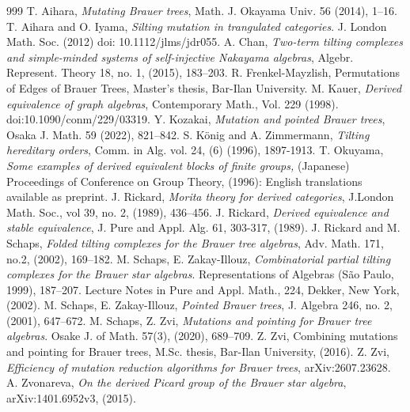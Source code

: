 \documentclass[11pt,english]{article}
\numberwithin{figure}{section}
\numberwithin{equation}{section}
\numberwithin{table}{section}
\theoremstyle{definition}
\theoremstyle{remark}
\begin{document}
\begin{thebibliography}{999}
	T. Aihara, \textit{ Mutating Brauer trees}, {Math. J. Okayama Univ}. 56 (2014), 1--16.
	T. Aihara and O. Iyama, \textit{ Silting mutation in trangulated categories}. J. London Math. Soc. (2012) doi: 10.1112/jlms/jdr055.
	A. Chan, \textit{Two-term tilting complexes and simple-minded systems of self-injective Nakayama algebras}, {Algebr. Represent. Theory 18}, no. 1, (2015), 183--203.
	 R. Frenkel-Mayzlish, Permutations of Edges of Brauer Trees, Master's thesis, Bar-Ilan University. 
	M. Kauer, \textit{Derived equivalence of graph algebras}, Contemporary Math., Vol. 229 (1998). doi:10.1090/conm/229/03319.
	 Y. Kozakai, \textit{Mutation and pointed Brauer trees},  Osaka J. Math. 59 (2022), 821–842. 
	S.  König and A. Zimmermann, \textit{Tilting hereditary orders},{ Comm. in Alg.} vol. 24, (6) (1996), 1897-1913.
	 T. Okuyama, \textit{Some examples of derived equivalent blocks of finite groups,} (Japanese)  Proceedings of Conference on Group Theory, (1996):  English translations available as preprint.
	J. Rickard, \textit{Morita theory for derived categories}, {J.London Math. Soc.}, vol 39, no. 2, (1989), 436--456.
	J. Rickard, \textit{Derived equivalence and stable equivalence},  {J. Pure and Appl. Alg.} 61, 303-317, (1989).
	J. Rickard and  M. Schaps, \textit{Folded tilting complexes for the Brauer tree algebras}, {Adv. Math.} 171, no.2, (2002), 169--182.
	M. Schaps, E. Zakay-Illouz, \textit{Combinatorial partial tilting complexes for the Brauer star algebras}. Representations of Algebras (São Paulo, 1999), 187--207. Lecture Notes in Pure and Appl. Math., 224, Dekker, New York, (2002). 
	M. Schaps, E. Zakay-Illouz, \textit{Pointed Brauer trees}, {J. Algebra} 246, no. 2, (2001), 647--672.
	M. Schaps, Z. Zvi, \textit{Mutations and pointing for Brauer tree algebras}. {Osake J. of Math.} 57(3), (2020), 689--709.
	 Z. Zvi, Combining mutations and pointing for Brauer trees, M.Sc. thesis, Bar-Ilan University, (2016).
	 Z. Zvi, \textit{Efficiency of mutation reduction algorithms for Brauer trees}, arXiv:2607.23628.	
	 A. Zvonareva, \textit{On the derived Picard group of the Brauer star algebra}, arXiv:1401.6952v3, (2015).
\end{thebibliography}
\end{document}
